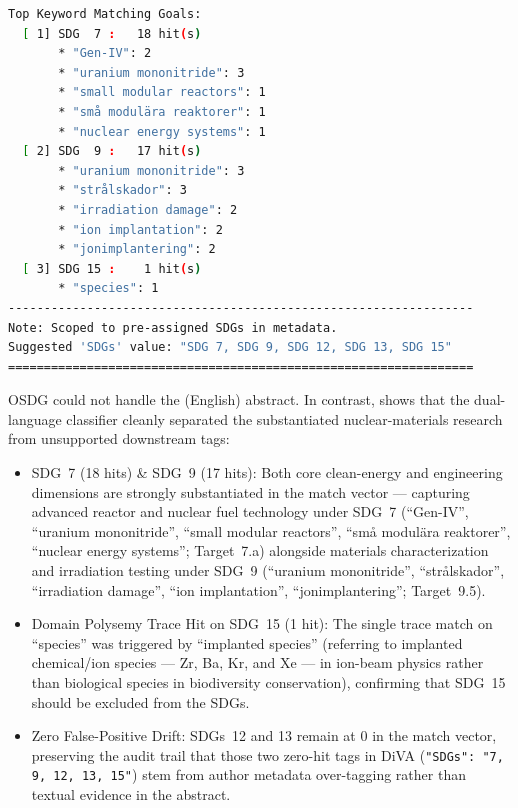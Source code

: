 \begin{casestudySection}
\begin{lstlisting}[language={bash}, basicstyle=\footnotesize, escapechar=|, breaklines=true,
    postbreak=\usebox{\lstbreakbox}, caption={Program's output}, label=lst:t_147969Output]
Top Keyword Matching Goals:
  [ 1] SDG  7 :   18 hit(s)
       * "Gen-IV": 2
       * "uranium mononitride": 3
       * "small modular reactors": 1
       * "små modulära reaktorer": 1
       * "nuclear energy systems": 1
  [ 2] SDG  9 :   17 hit(s)
       * "uranium mononitride": 3
       * "strålskador": 3
       * "irradiation damage": 2
       * "ion implantation": 2
       * "jonimplantering": 2
  [ 3] SDG 15 :    1 hit(s)
       * "species": 1
-----------------------------------------------------------------
Note: Scoped to pre-assigned SDGs in metadata.
Suggested 'SDGs' value: "SDG 7, SDG 9, SDG 12, SDG 13, SDG 15"
=================================================================
\end{lstlisting}
OSDG could not handle the (English) abstract. In contrast,  shows that the dual-language classifier cleanly separated the substantiated nuclear-materials research from unsupported downstream tags:
\begin{itemize}
    \item \gls{SDG}~7 (\num{18} hits) \& \gls{SDG}~9 (\num{17} hits): Both core clean-energy and engineering dimensions are strongly substantiated in the match vector --- capturing advanced reactor and nuclear fuel technology under \gls{SDG}~7 (\enquote{Gen-IV}, \enquote{uranium mononitride}, \enquote{small modular reactors}, \enquote{\foreignlanguage{swedish}{små modulära reaktorer}}, \enquote{nuclear energy systems}; Target~7.a) alongside materials characterization and irradiation testing under \gls{SDG}~9 (\enquote{uranium mononitride}, \enquote{\foreignlanguage{swedish}{strålskador}}, \enquote{irradiation damage}, \enquote{ion implantation}, \enquote{\foreignlanguage{swedish}{jonimplantering}}; Target~9.5).

    \item Domain Polysemy Trace Hit on \gls{SDG}~15 (\num{1} hit): The single trace match on \enquote{species} was triggered by \enquote{implanted species} (referring to implanted chemical/ion species --- Zr, Ba, Kr, and Xe --- in ion-beam physics rather than biological species in biodiversity conservation), confirming that \gls{SDG}~15 should be excluded from the \glspl{SDG}.

    \item Zero False-Positive Drift: \glspl{SDG}~12 and 13 remain at \num{0} in the match vector, preserving the audit trail that those two zero-hit tags in \gls{DiVA} (\texttt{"SDGs": "7, 9, 12, 13, 15"}) stem from author metadata over-tagging rather than textual evidence in the abstract.
\end{itemize}
\end{casestudySection}

